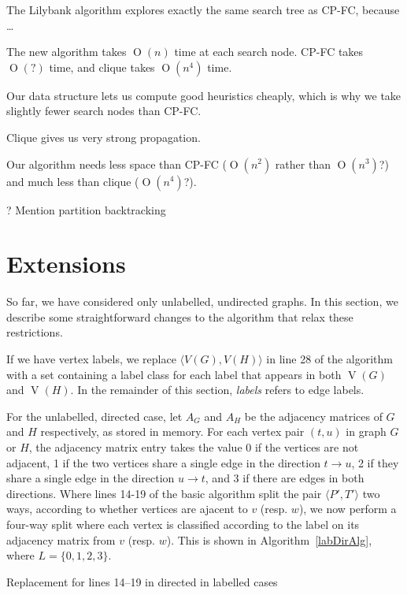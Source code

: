 \documentclass[letterpaper]{article}
\DeclareMathOperator{\V}{V}
\newcommand{\BigO}[1]{\ensuremath{\operatorname{O}\left(#1\right)}}
\begin{document}
The Lilybank algorithm explores exactly the same search tree as CP-FC, because \dots

The new algorithm takes $\BigO{n}$ time at each search node. CP-FC takes $\BigO{?}$ time,
and clique takes $\BigO{n^4}$ time.

Our data structure lets us compute good heuristics cheaply, which is why we take
slightly fewer search nodes than CP-FC.

Clique gives us very strong propagation.

Our algorithm needs less space than CP-FC ($\BigO{n^2}$ rather than $\BigO{n^3}$?) and
much less than clique ($\BigO{n^4}$?).

? Mention partition backtracking

\section{Extensions}\label{sec:extensions}

So far, we have considered only unlabelled, undirected graphs. In this section, we
describe some straightforward changes to the algorithm that relax these restrictions.

If we have vertex labels, we replace ${\langle V(G),V(H) \rangle}$ in line 28 of
the algorithm with a set containing a label class for each label that appears in
both $\V(G)$ and $\V(H)$. In the remainder of this section, \textit{labels} refers to
edge labels.

For the unlabelled, directed case, let $A_G$ and $A_H$ be the adjacency matrices
of $G$ and $H$ respectively, as stored in memory. For each
vertex pair $(t,u)$ in graph $G$ or $H$, the adjacency matrix entry 
takes the value 0 if the vertices are
not adjacent, 1 if the two vertices share a single edge in the direction $t
\rightarrow u$, 2 if they share a single edge in the direction $u \rightarrow
t$, and 3 if there are edges in both directions. Where lines 14-19 of the
basic algorithm split the pair $\langle P',T' \rangle$ two ways, according to whether
vertices are ajacent to $v$ (resp. $w$), we now perform a four-way split where
each vertex is classified according to the label on its adjacency matrix from $v$
(resp. $w$). This is shown in Algorithm~\ref{labDirAlg}, where $L=\{0,1,2,3\}$.

\begin{algorithm}
\DontPrintSemicolon
\nl    {}
\caption{Replacement for lines 14--19 in directed in labelled cases}
\label{labDirAlg}
\end{algorithm}
\end{document}

